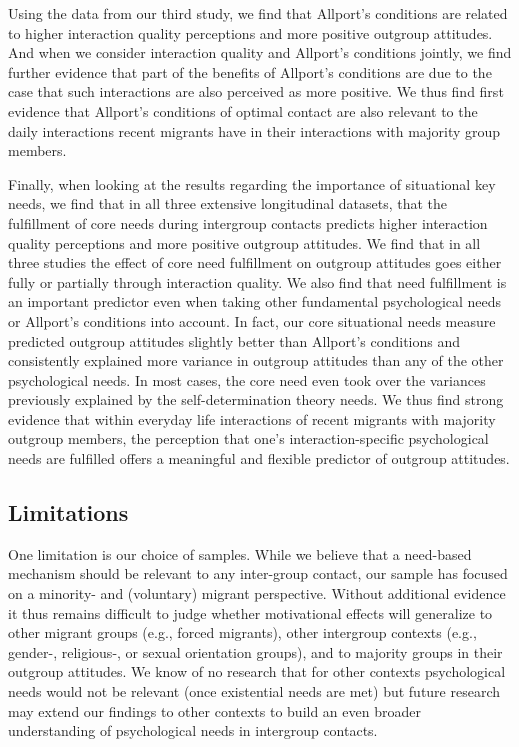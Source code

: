 \documentclass[man, 12pt, a4paper, mask]{apa7}
\theoremstyle{break}
\theoremstyle{plain}
\begin{document}
Using the data from our third study, we find that Allport's conditions are related to higher interaction quality perceptions and more positive outgroup attitudes. And when we consider interaction quality and Allport's conditions jointly, we find further evidence that part of the benefits of Allport's conditions are due to the case that such interactions are also perceived as more positive. We thus find first evidence that Allport's conditions of optimal contact are also relevant to the daily interactions recent migrants have in their interactions with majority group members. 

Finally, when looking at the results regarding the importance of situational key needs, we find that in all three extensive longitudinal datasets, that the fulfillment of core needs during intergroup contacts predicts higher interaction quality perceptions and more positive outgroup attitudes. We find that in all three studies the effect of core need fulfillment on outgroup attitudes goes either fully or partially through interaction quality. We also find that need fulfillment is an important predictor even when taking other fundamental psychological needs or Allport's conditions into account. In fact, our core situational needs measure predicted outgroup attitudes slightly better than Allport's conditions and consistently explained more variance in outgroup attitudes than any of the other psychological needs. In most cases, the core need even took over the variances previously explained by the self-determination theory needs. We thus find strong evidence that within everyday life interactions of recent migrants with majority outgroup members, the perception that one's interaction-specific psychological needs are fulfilled offers a meaningful and flexible predictor of outgroup attitudes.

\subsection{Limitations}
One limitation is our choice of samples. While we believe that a need-based mechanism should be relevant to any inter-group contact, our sample has focused on a minority- and (voluntary) migrant perspective. Without additional evidence it thus remains difficult to judge whether motivational effects will generalize to other migrant groups (e.g., forced migrants), other intergroup contexts (e.g., gender-, religious-, or sexual orientation groups), and to majority groups in their outgroup attitudes. We know of no research that for other contexts psychological needs would not be relevant (once existential needs are met) but future research may extend our findings to other contexts to build an even broader understanding of psychological needs in intergroup contacts. 
\end{document}
